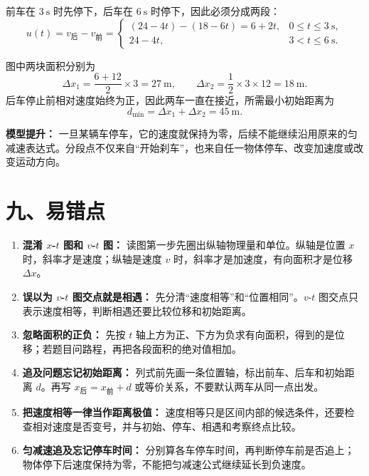 \begin{competitionbox}
前车在 $3\ \mathrm{s}$ 时先停下，后车在 $6\ \mathrm{s}$ 时停下，因此必须分成两段：
\[
u(t)=v_{\text{后}}-v_{\text{前}}
=
\begin{cases}
(24-4t)-(18-6t)=6+2t, & 0\le t\le 3\ \mathrm{s},\\
24-4t, & 3<t\le 6\ \mathrm{s}.
\end{cases}
\]

\pagebreak[4]
\begin{center}


\label{fig:relative-braking-ut}
\end{center}

图中两块面积分别为
\[
\Delta x_1=\frac{6+12}{2}\times3=27\ \mathrm{m},\qquad
\Delta x_2=\frac12\times3\times12=18\ \mathrm{m}.
\]
后车停止前相对速度始终为正，因此两车一直在接近，所需最小初始距离为
\[
d_{\min}=\Delta x_1+\Delta x_2=45\ \mathrm{m}.
\]

\textbf{模型提升：} 一旦某辆车停车，它的速度就保持为零，后续不能继续沿用原来的匀减速表达式。分段点不仅来自“开始刹车”，也来自任一物体停车、改变加速度或改变运动方向。
\end{competitionbox}

\section*{九、易错点}

\begin{mistakebox}
\begin{enumerate}
  \item \textbf{混淆 $x$-$t$ 图和 $v$-$t$ 图：} 读图第一步先圈出纵轴物理量和单位。纵轴是位置 $x$ 时，斜率才是速度；纵轴是速度 $v$ 时，斜率才是加速度，有向面积才是位移 $\Delta x$。

  \item \textbf{误以为 $v$-$t$ 图交点就是相遇：} 先分清“速度相等”和“位置相同”。$v$-$t$ 图交点只表示速度相等，判断相遇还要比较位移和初始距离。

  \item \textbf{忽略面积的正负：} 先按 $t$ 轴上方为正、下方为负求有向面积，得到的是位移；若题目问路程，再把各段面积的绝对值相加。

  \item \textbf{追及问题忘记初始距离：} 列式前先画一条位置轴，标出前车、后车和初始距离 $d$。再写 $x_{\text{后}}=x_{\text{前}}+d$ 或等价关系，不要默认两车从同一点出发。

  \item \textbf{把速度相等一律当作距离极值：} 速度相等只是区间内部的候选条件，还要检查相对速度是否变号，并与初始、停车、相遇和考察终点比较。

  \item \textbf{匀减速追及忘记停车时间：} 分别算各车停车时间，再判断停车前是否追上；物体停下后速度保持为零，不能把匀减速公式继续延长到负速度。
\end{enumerate}
\end{mistakebox}

